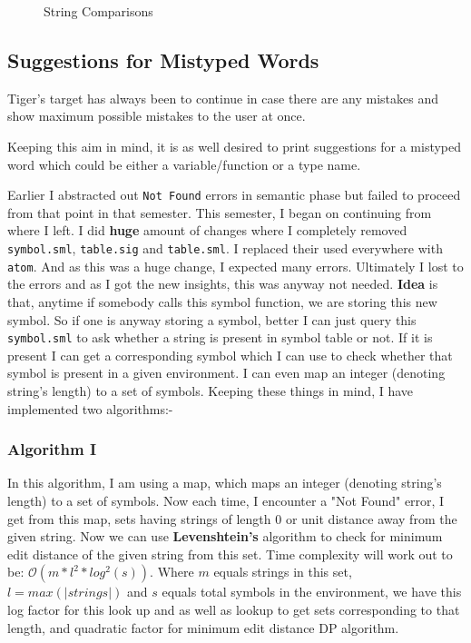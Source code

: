 \begin{figure}
\centering
{}
\caption{String Comparisons}
\label{fig:sc}
\end{figure}

\subsection{Suggestions for Mistyped Words}

Tiger's target has always been to continue in case there are any mistakes and show maximum possible mistakes to the user at once. 

Keeping this aim in mind, it is as well desired to print suggestions for a mistyped word which could be either a variable/function or a type name. 

Earlier I abstracted out \texttt{Not Found} errors in semantic phase but failed to proceed from that point in that semester. This semester, I began on continuing from where I left. I did \textbf{huge} amount of changes where I completely removed \texttt{symbol.sml}, \texttt{table.sig} and \texttt{table.sml}. I replaced their used everywhere with \texttt{atom}. And as this was a huge change, I expected many errors. Ultimately I lost to the errors and as I got the new insights, this was anyway not needed. \textbf{Idea} is that, anytime if somebody calls this symbol function, we are storing this new symbol. So if one is anyway storing a symbol, better I can just query this \texttt{symbol.sml} to ask whether a string is present in symbol table or not. If it is present I can get a corresponding symbol which I can use to check whether that symbol is present in a given environment. I can even map an integer (denoting string's length) to a set of symbols. Keeping these things in mind, I have implemented two algorithms:-

\subsubsection{Algorithm I}

In this algorithm, I am using a map, which maps an integer (denoting string's length) to a set of symbols. Now each time, I encounter a "Not Found" error, I get from this map, sets having strings of length 0 or unit distance away from the given string. Now we can use \textbf{Levenshtein's} algorithm to check for minimum edit distance of the given string from this set. Time complexity will work out to be: $\mathcal{O}(m * l^2 * log^2(s))$. Where $m$ equals strings in this set, $l = max(|strings|)$ and $s$ equals total symbols in the environment, we have this log factor for this look up and as well as lookup to get sets corresponding to that length, and quadratic factor for minimum edit distance DP algorithm.

